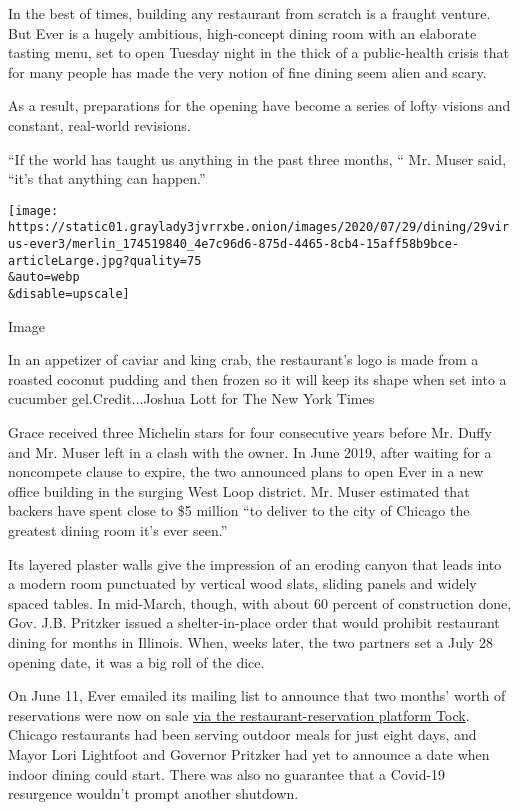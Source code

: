 In the best of times, building any restaurant from scratch is a fraught
venture. But Ever is a hugely ambitious, high-concept dining room with
an elaborate tasting menu, set to open Tuesday night in the thick of a
public-health crisis that for many people has made the very notion of
fine dining seem alien and scary.

As a result, preparations for the opening have become a series of lofty
visions and constant, real-world revisions.

``If the world has taught us anything in the past three months, `` Mr.
Muser said, ``it's that anything can happen.''

\texttt{[image: https://static01.graylady3jvrrxbe.onion/images/2020/07/29/dining/29virus-ever3/merlin\_174519840\_4e7c96d6-875d-4465-8cb4-15aff58b9bce-articleLarge.jpg?quality=75\\\&auto=webp\\\&disable=upscale]}

Image

In an appetizer of caviar and king crab, the restaurant's logo is made
from a roasted coconut pudding and then frozen so it will keep its shape
when set into a cucumber gel.Credit...Joshua Lott for The New York Times

Grace received three Michelin stars for four consecutive years before
Mr. Duffy and Mr. Muser left in a clash with the owner. In June 2019,
after waiting for a noncompete clause to expire, the two announced plans
to open Ever in a new office building in the surging West Loop district.
Mr. Muser estimated that backers have spent close to \$5 million ``to
deliver to the city of Chicago the greatest dining room it's ever
seen.''

Its layered plaster walls give the impression of an eroding canyon that
leads into a modern room punctuated by vertical wood slats, sliding
panels and widely spaced tables. In mid-March, though, with about 60
percent of construction done, Gov. J.B. Pritzker issued a
shelter-in-place order that would prohibit restaurant dining for months
in Illinois. When, weeks later, the two partners set a July 28 opening
date, it was a big roll of the dice.

On June 11, Ever emailed its mailing list to announce that two months'
worth of reservations were now on sale
\href{https://www.exploretock.com/ever/}{via the restaurant-reservation
platform Tock}. Chicago restaurants had been serving outdoor meals for
just eight days, and Mayor Lori Lightfoot and Governor Pritzker had yet
to announce a date when indoor dining could start. There was also no
guarantee that a Covid-19 resurgence wouldn't prompt another shutdown.

